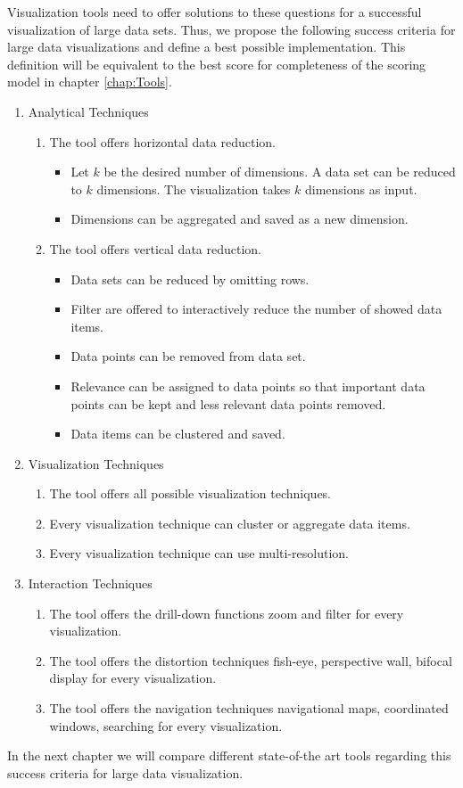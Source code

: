Visualization tools need to offer solutions to these questions for a successful visualization of large data sets. Thus, we propose the following success criteria for large data visualizations and define a best possible implementation. This definition will be equivalent to the best score for completeness of the scoring model in chapter \ref{chap:Tools}.
\begin{enumerate} [noitemsep]
\item Analytical Techniques 
\begin{enumerate}
    \item The tool offers horizontal data reduction.
    \begin{itemize}
        \item Let $k$ be the desired number of dimensions. A data set can be reduced to $k$ dimensions. The visualization takes $k$ dimensions as input.
        \item Dimensions can be aggregated and saved as a new dimension.
    \end{itemize}
    \item The tool offers vertical data reduction.
    \begin{itemize}
        \item Data sets can be reduced by omitting rows.
        \item Filter are offered to interactively reduce the number of showed data items.
        \item Data points can be removed from data set. 
        \item Relevance can be assigned to data points so that important data points can be kept and less relevant data points removed.
        \item Data items can be clustered and saved.  
    \end{itemize}
\end{enumerate}


\item Visualization Techniques
\begin{enumerate}
\item The tool offers all possible visualization techniques.
\item Every visualization technique can cluster or aggregate data items.
\item Every visualization technique can use multi-resolution.
\end{enumerate}

\item Interaction Techniques
\begin{enumerate}
\item The tool offers the drill-down functions zoom and filter for every visualization.
\item The tool offers the distortion techniques fish-eye, perspective wall, bifocal display for every visualization.
\item The tool offers the navigation techniques navigational maps, coordinated windows, searching for every visualization.
\end{enumerate}

\end{enumerate}

In the next chapter we will compare different state-of-the art tools regarding this success criteria for large data visualization.

